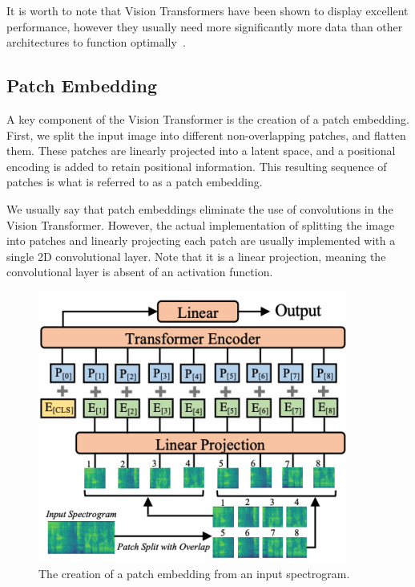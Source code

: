 It is worth to note that Vision Transformers have been shown to display excellent performance, however they usually need more significantly more data than other architectures to function optimally~\cite{dosovitskiy2021imageworth16x16words}.

\subsection{Patch Embedding}

A key component of the Vision Transformer is the creation of a patch embedding. First, we split the input image into different non-overlapping patches, and flatten them. These patches are linearly projected into a latent space, and a positional encoding is added to retain positional information. This resulting sequence of patches is what is referred to as a patch embedding.

We usually say that patch embeddings eliminate the use of convolutions in the Vision Transformer. However, the actual implementation of splitting the image into patches and linearly projecting each patch are usually implemented with a single 2D convolutional layer. Note that it is a linear projection, meaning the convolutional layer is absent of an activation function.

\begin{figure}[H]
    \centering
    \includegraphics[trim=0 0 0 132, clip, scale=0.7]{figures/patchembedding.png}
    \caption{The creation of a patch embedding from an input spectrogram.}
    \label{PatchEmbeddingFigure}
\end{figure}

